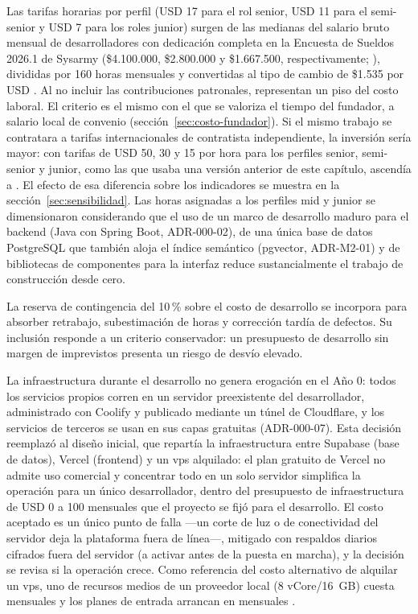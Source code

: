 Las tarifas horarias por perfil (USD 17 para el rol senior, USD 11 para
el semi-senior y USD 7 para los roles junior) surgen de las medianas del
salario bruto mensual de desarrolladores con dedicación completa en la
Encuesta de Sueldos 2026.1 de Sysarmy (\$4.100.000, \$2.800.000 y
\$1.667.500, respectivamente; \citealp{sysarmy2026}), divididas por 160
horas mensuales y convertidas al tipo de cambio de \$1.535 por USD
\citep{bna2026}. Al no incluir las contribuciones patronales, representan
un piso del costo laboral. El criterio es el mismo con el que se valoriza
el tiempo del fundador, a salario local de convenio
(sección~\ref{sec:costo-fundador}). Si el mismo trabajo se contratara a
tarifas internacionales de contratista independiente, la inversión sería
mayor: con tarifas de USD 50, 30 y 15 por hora para los perfiles senior,
semi-senior y junior, como las que usaba una versión anterior de este
capítulo, ascendía a . El efecto de esa diferencia sobre los
indicadores se muestra en la sección~\ref{sec:sensibilidad}. Las horas asignadas a los perfiles mid y junior
se dimensionaron considerando que el uso de un marco de desarrollo maduro
para el backend (Java con Spring Boot, ADR-000-02), de una única base de
datos PostgreSQL que también aloja el índice semántico (pgvector,
ADR-M2-01) y de bibliotecas de componentes para la interfaz reduce
sustancialmente el trabajo de construcción desde cero.

La reserva de contingencia del 10\,\% sobre el costo de desarrollo se
incorpora para absorber retrabajo, subestimación de horas y corrección
tardía de defectos. Su inclusión responde a un criterio conservador: un
presupuesto de desarrollo sin margen de imprevistos presenta un riesgo de
desvío elevado.

La infraestructura durante el desarrollo no genera erogación en el
Año 0: todos los servicios propios corren en un servidor preexistente
del desarrollador, administrado con Coolify y publicado mediante un túnel
de Cloudflare, y los servicios de terceros se usan en sus capas gratuitas
(ADR-000-07). Esta decisión reemplazó al diseño inicial, que repartía la
infraestructura entre Supabase (base de datos), Vercel (frontend) y un
\gls{vps} alquilado: el plan gratuito de Vercel no admite uso comercial y
concentrar todo en un solo servidor simplifica la operación para un único
desarrollador, dentro del presupuesto de infraestructura de USD 0 a 100
mensuales que el proyecto se fijó para el desarrollo. El costo aceptado es
un único punto de falla —un corte de luz o de conectividad del servidor
deja la plataforma fuera de línea—, mitigado con respaldos diarios
cifrados fuera del servidor (a activar antes de la puesta en marcha), y la decisión se revisa si la operación
crece. Como referencia del costo alternativo de alquilar un \gls{vps}, uno
de recursos medios de un proveedor local (8 vCore/16~GB) cuesta
 mensuales y los planes de entrada arrancan en 
mensuales \citep{lightnode2026}.

